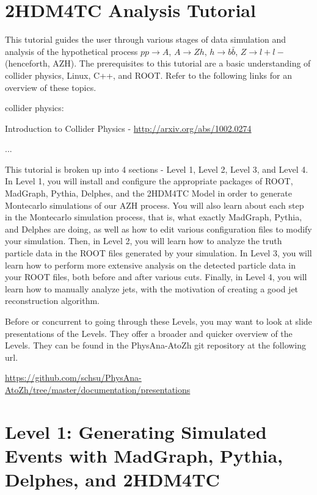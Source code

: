 \documentclass{article}
\begin{document}
\section*{2HDM4TC Analysis Tutorial}

This tutorial guides the user through various stages of data simulation and analysis of the hypothetical process $p p \rightarrow{} A$, $A \rightarrow{} Z h$, $h \rightarrow{} b \bar{b}$, $Z \rightarrow{} l+ l-$ (henceforth, AZH). The prerequisites to this tutorial are a basic understanding of collider physics, Linux, C++, and ROOT. Refer to the following links for an overview of these topics.

\bigskip

collider physics:

Introduction to Collider Physics - \url{http://arxiv.org/abs/1002.0274}

...

\bigskip

This tutorial is broken up into 4 sections - Level 1, Level 2, Level 3, and Level 4. In Level 1, you will install and configure the appropriate packages of ROOT, MadGraph, Pythia, Delphes, and the 2HDM4TC Model in order to generate Montecarlo simulations of our AZH process. You will also learn about each step in the Montecarlo simulation process, that is, what exactly MadGraph, Pythia, and Delphes are doing, as well as how to edit various configuration files to modify your simulation. Then, in Level 2, you will learn how to analyze the truth particle data in the ROOT files generated by your simulation. In Level 3, you will learn how to perform more extensive analysis on the detected particle data in your ROOT files, both before and after various cuts. Finally, in Level 4, you will learn how to manually analyze jets, with the motivation of creating a good jet reconstruction algorithm.

\bigskip

Before or concurrent to going through these Levels, you may want to look at slide presentations of the Levels. They offer a broader and quicker overview of the Levels. They can be found in the PhysAna-AtoZh git repository at the following url.

\bigskip

\url{https://github.com/schsu/PhysAna-AtoZh/tree/master/documentation/presentations}

\section{Level 1: Generating Simulated Events with MadGraph, Pythia, Delphes, and 2HDM4TC}
\end{document}
